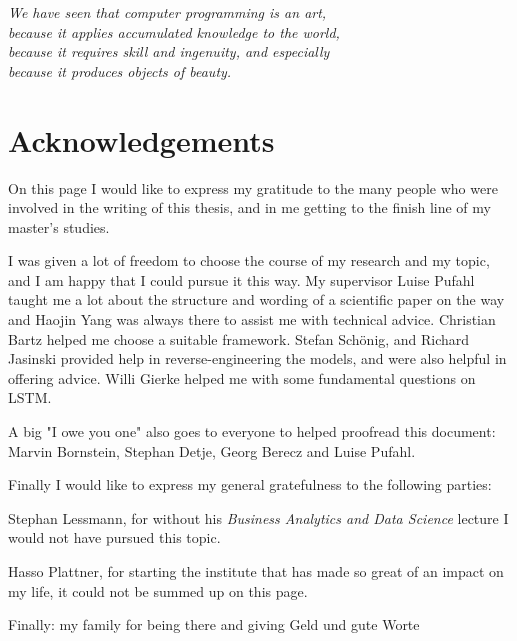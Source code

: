
\begin{flushright}{\slshape
We have seen that computer programming is an art, \\
because it applies accumulated knowledge to the world, \\
because it requires skill and ingenuity, and especially \\
because it produces objects of beauty.} \\ \medskip
\end{flushright}

\bigskip


\begingroup

\let\clearpage\relax
\let\cleardoublepage\relax
\let\cleardoublepage\relax

\chapter*{Acknowledgements}
On this page I would like to express my gratitude to the many people who were involved
in the writing of this thesis, and in me getting to the finish line of my master's studies.

I was given a lot of freedom to choose the course of my research and my topic,
and I am happy that I could pursue it this way. My supervisor Luise Pufahl
taught me a lot about the structure and wording of a scientific paper on the way
and Haojin Yang was always there to assist me with technical advice.
Christian Bartz helped me choose a suitable framework.
Stefan Schönig, and Richard Jasinski provided help in reverse-engineering the models,
and were also helpful in offering advice.
Willi Gierke helped me with some fundamental questions on LSTM.

A big "I owe you one" also goes to everyone to helped proofread this document:
Marvin Bornstein, Stephan Detje, Georg Berecz and Luise Pufahl.

Finally I would like to express my general gratefulness to the following parties:

Stephan Lessmann, for without his \textit{Business Analytics and Data Science} lecture I would not have pursued this topic.

Hasso Plattner, for starting the institute that has made so great of an impact on my life, it could not be summed up on this page.

Finally: my family for being there and giving Geld und gute Worte
\endgroup
